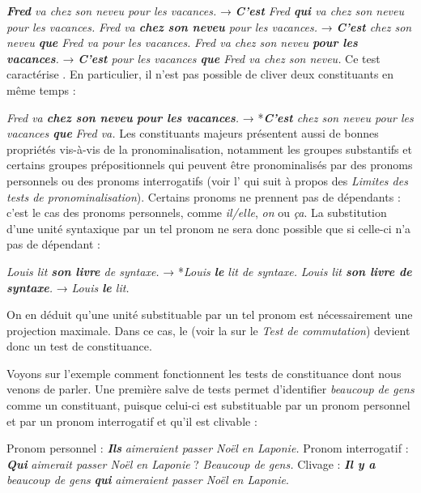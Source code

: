 \ea \ea\textit{\textbf{{Fred}}  {va chez son neveu pour les vacances.}}
→ \textit{\textbf{{C’est}}  {Fred} \textbf{{qui}}  {va chez son neveu pour les vacances.}}
\ex
\textit{{Fred va} \textbf{{chez son neveu}}  {pour les vacances.}}
→ \textit{\textbf{{C’est}} chez son neveu \textbf{{que}} Fred va pour les vacances.}
\ex
\textit{{Fred va chez son neveu} \textbf{{pour les vacances}}.}
→ \textit{\textbf{{C’est}}  {pour les vacances} \textbf{{que}}  {Fred va chez son neveu.}}
\z\z
Ce test caractérise . En particulier, il n’est pas possible de cliver deux constituants en même temps :

\ea
\textit{{Fred va} \textbf{{chez son neveu}} \textbf{{pour les vacances}}.}
→  *\textit{\textbf{{C’est}}  {chez son neveu pour les vacances} \textbf{{que}}} \textit{Fred va.}
\z
Les constituants majeurs présentent aussi de bonnes propriétés vis-à-vis de la pronominalisation, notamment les groupes substantifs et certains groupes prépositionnels qui peuvent être pronominalisés par des pronoms personnels ou des pronoms interrogatifs (voir l’ qui suit à propos des \textit{Limites des tests de pronominalisation}). Certains pronoms ne prennent pas de dépendants : c’est le cas des pronoms personnels, comme \textit{il/elle}, \textit{on} ou \textit{ça}. La substitution d’une unité syntaxique par un tel pronom ne sera donc possible que si celle-ci n’a pas de dépendant :

\ea\ea
    \textit{{Louis lit} \textbf{son livre}  {de syntaxe.}}    →  *\textit{Louis \textbf{{le}}  {lit de syntaxe.}}
\ex
    \textit{{Louis lit} \textbf{{son livre de syntaxe}}.}  →   \textit{{Louis} \textbf{{le}}  {lit.}}
\z\z

On en déduit qu’une unité substituable par un tel pronom est nécessairement une projection maximale. Dans ce cas, le  (voir la  sur le \textit{Test de commutation}) devient donc un test de constituance.

Voyons sur l'exemple  comment fonctionnent les tests de constituance dont nous venons de parler. Une première salve de tests permet d’identifier \textit{beaucoup de gens} comme un constituant, puisque celui-ci est substituable par un pronom personnel et par un pronom interrogatif et qu’il est clivable :

\ea
\ea Pronom personnel : \textbf{\textit{Ils}} \textit{aimeraient passer Noël} \textit{en Laponie.}
\ex Pronom interrogatif : \textbf{\textit{Qui}} \textit{aimerait passer Noël} \textit{en Laponie} ? \textit{Beaucoup de}                   \textit{gens.}
\ex Clivage : \textbf{\textit{Il y a}} \textit{beaucoup de gens} \textbf{\textit{qui}} \textit{aimeraient passer Noël} \textit{en Laponie}.
\z\z

